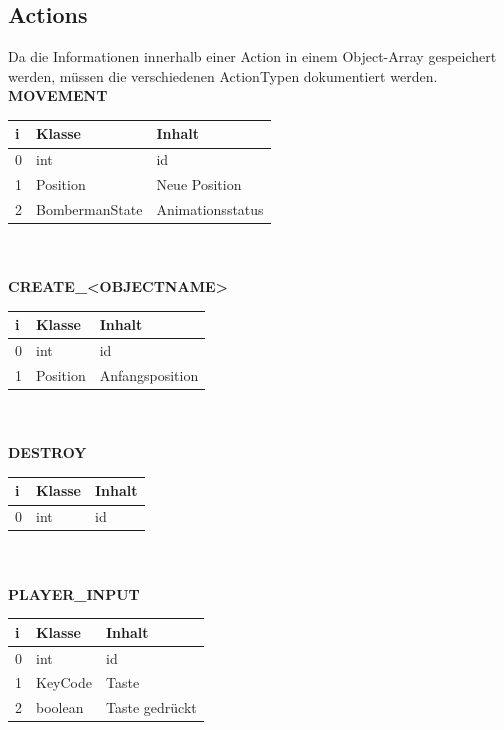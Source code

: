 \documentclass[11pt]{scrartcl}
\begin{document}
\newpage

\subsection{Actions}
Da die Informationen innerhalb einer Action in einem Object-Array gespeichert werden, müssen die verschiedenen ActionTypen dokumentiert werden.\\

\textbf{MOVEMENT}\\

\begin{tabularx}{\linewidth}{l l l}
\textbf{i} & \textbf{Klasse} & \textbf{Inhalt}\\
\hline
0 & int & id\\
1 & Position & Neue Position\\
2 & BombermanState & Animationsstatus\\
\end{tabularx}\\\\

\textbf{CREATE\_<OBJECTNAME>}\\

\begin{tabularx}{\linewidth}{l l l}
\textbf{i} & \textbf{Klasse} & \textbf{Inhalt}\\
\hline
0 & int & id\\
1 & Position & Anfangsposition\\
\end{tabularx}\\\\

\textbf{DESTROY}\\

\begin{tabularx}{\linewidth}{l l l}
\textbf{i} & \textbf{Klasse} & \textbf{Inhalt}\\
\hline
0 & int & id\\
\end{tabularx}\\\\

\textbf{PLAYER\_INPUT}\\

\begin{tabularx}{\linewidth}{l l l}
\textbf{i} & \textbf{Klasse} & \textbf{Inhalt}\\
\hline
0 & int & id\\
1 & KeyCode & Taste\\
2 & boolean & Taste gedrückt\\
\end{tabularx}\\\\
\end{document}
